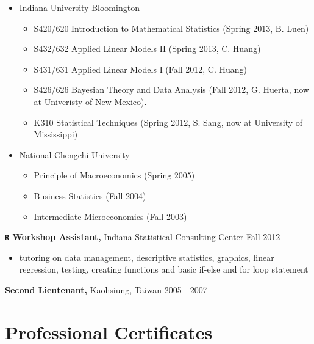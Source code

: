 \documentclass[]{res}
\begin{document}
\begin{resume}
\begin{itemize}
\begin{itemize}
 	\end{itemize}
 \item Indiana University Bloomington \hfill
 	\begin{itemize}\itemsep -2pt 
 	\item S420/620 Introduction to Mathematical Statistics (Spring 2013, B. Luen)
 	\item S432/632 Applied Linear Models II (Spring 2013, C. Huang)
 	\item S431/631 Applied Linear Models I (Fall 2012, C. Huang)
 	\item S426/626 Bayesian Theory and Data Analysis (Fall 2012, G. Huerta, now at Univeristy of New Mexico).
 	\item K310 Statistical Techniques (Spring 2012, S. Sang, now at University of Mississippi)
 	\end{itemize}
 \item National Chengchi University \hfill
 	\begin{itemize} \itemsep -2pt 
 	\item Principle of Macroeconomics (Spring 2005)
 	\item Business Statistics (Fall 2004)
 	\item Intermediate Microeconomics (Fall 2003)

 	\end{itemize}
 \end{itemize}
  \vspace{-0.3cm} 
 {\bf \texttt{R} Workshop Assistant,} Indiana Statistical Consulting Center \hfill Fall 2012
 \begin{itemize} \itemsep -2pt  %
 \item tutoring on data management, descriptive statistics, graphics, linear regression, testing, creating functions and basic if-else and for loop statement
 \end{itemize} 
 
 {\bf Second Lieutenant,} Kaohsiung, Taiwan \hfill 2005 - 2007

\section{Professional Certificates} 


\end{resume}
\end{document}
